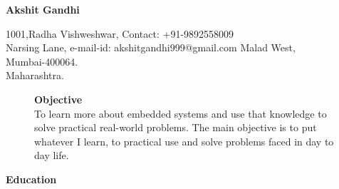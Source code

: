 \documentclass{article}
\begin{document}
	
	\begin{center}
		{
			\Large\textbf{Akshit Gandhi}
		}
		
	\end{center}
	
	\begin{flushleft}
		1001,Radha Vishweshwar, 		\hspace{2.8in}    		    Contact: +91-9892558009            \\
		Narsing Lane, 		\hspace{2.85in}		    e-mail-id: akshitgandhi999@gmail.com \hspace{2.8in}
		Malad West, \\
		Mumbai-400064.     \\
		Maharashtra.\\
		
	\end{flushleft}
	\vspace{-0.3in}
	\begin{figure}[h]
		{%
		\hspace{4.4in}
\setlength{\fboxsep}{2.5pt}%
\setlength{\fboxrule}{1pt}%
%
}%
		\begin{flushleft}
\textrm{\textbf{Objective}}\\
\textrm{To learn more about embedded systems and use that knowledge to solve practical real-world problems. The main objective is to put whatever I learn, to practical use and solve problems faced in day to day life.}
\end{flushleft}
	\end{figure}
	
\begin{flushleft}
		
		\textbf{Education}
	\end{flushleft}
	
\end{document}
